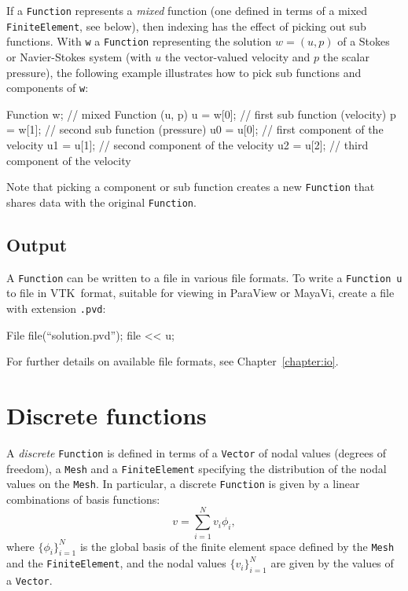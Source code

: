 If a \texttt{Function} represents a \emph{mixed} function (one defined in terms
of a mixed \texttt{FiniteElement}, see below), then indexing has the effect of
picking out sub functions. With \texttt{w} a \texttt{Function} representing the
solution $w = (u, p)$ of a Stokes or Navier-Stokes system (with $u$ the vector-valued
velocity and $p$ the scalar pressure), the following example illustrates how to
pick sub functions and components of \texttt{w}:
\begin{code}
Function w; // mixed Function (u, p)
u = w[0];   // first sub function (velocity)
p = w[1];   // second sub function (pressure)
u0 = u[0];  // first component of the velocity
u1 = u[1];  // second component of the velocity
u2 = u[2];  // third component of the velocity
\end{code}

Note that picking a component or sub function creates a new
\texttt{Function} that shares data with the original \texttt{Function}.

\subsection{Output}

A \texttt{Function} can be written to a file in various file formats.
To write a \texttt{Function}~\texttt{u} to file in VTK~format,
suitable for viewing in ParaView or MayaVi, create a file with
extension \texttt{.pvd}:
\begin{code}
File file(``solution.pvd'');
file << u;
\end{code}

For further details on available file formats, see
Chapter~\ref{chapter:io}.

\section{Discrete functions}

A \emph{discrete} \texttt{Function} is defined in terms of a \texttt{Vector} of nodal
values (degrees of freedom), a \texttt{Mesh} and
a \texttt{FiniteElement} specifying the distribution of the nodal values
on the \texttt{Mesh}. In particular, a discrete \texttt{Function}
is given by a linear combinations of basis functions:
\begin{equation}
  v = \sum_{i=1}^{N} v_i \phi_{i},
\end{equation}
where $\{\phi_i\}_{i=1}^N$ is the global basis of the finite element
space defined by the \texttt{Mesh} and the \texttt{FiniteElement}, and
the nodal values $\{v_i\}_{i=1}^N$ are given by the values of a
\texttt{Vector}.

